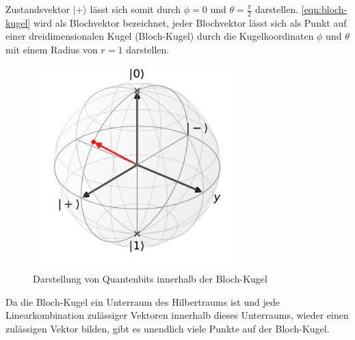 Zustandsvektor $|+\rangle$ l\"asst sich somit durch $\phi= 0$ und $\theta = \frac{\pi}{2}$ darstellen. \ref{eqn:bloch-kugel} wird als Blochvektor bezeichnet, jeder Blochvektor l\"asst sich als Punkt auf einer dreidimensionalen Kugel (Bloch-Kugel) durch die Kugelkoordinaten $\phi$ und $\theta$ mit einem Radius von $r = 1$ darstellen.
\begin{figure}[h]
\centering
\includegraphics[width=0.7\textwidth]{figures/blochsphere.pdf}
\caption{Darstellung von Quantenbits innerhalb der Bloch-Kugel}
\label{fig:Bloch-Kugel}
\end{figure}
Da die Bloch-Kugel ein Unterraum des Hilbertraums ist und jede Linearkombination zul\"assiger Vektoren innerhalb dieses Unterraums, wieder einen zul\"assigen Vektor bilden, gibt es unendlich viele Punkte auf der Bloch-Kugel.
